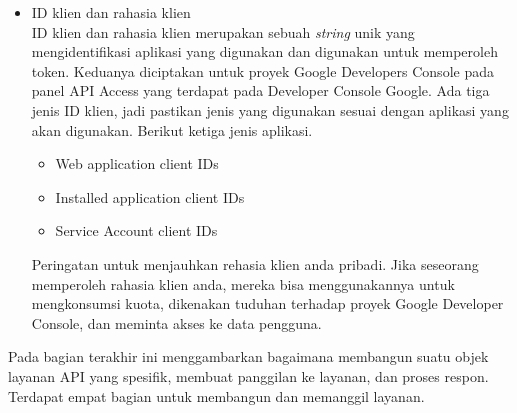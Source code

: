 \begin{itemize}
\begin{itemize}
    \item ID klien dan rahasia klien\\
    ID klien dan rahasia klien merupakan sebuah {\it string} unik yang mengidentifikasi aplikasi yang digunakan dan digunakan untuk memperoleh token. Keduanya diciptakan untuk proyek Google Developers Console pada panel API Access yang terdapat pada Developer Console Google. Ada tiga jenis ID klien, jadi pastikan jenis yang digunakan sesuai dengan aplikasi yang akan digunakan. Berikut ketiga  jenis aplikasi.
    \begin{itemize}
    \item Web application client IDs
    \item Installed application client IDs
    \item Service Account client IDs
    \end{itemize}
    Peringatan untuk menjauhkan rehasia klien anda pribadi. Jika seseorang memperoleh rahasia klien anda, mereka bisa menggunakannya untuk mengkonsumsi kuota, dikenakan tuduhan terhadap proyek Google Developer Console, dan meminta akses ke data pengguna.
    \end{itemize}
\end{itemize}

Pada bagian terakhir ini menggambarkan bagaimana membangun suatu objek layanan API yang spesifik, membuat panggilan ke layanan, dan proses respon. Terdapat empat bagian untuk membangun dan memanggil layanan.

